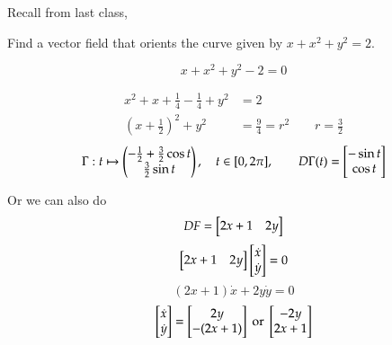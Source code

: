 Recall from last class, 

 Find a vector field that orients the curve given by $x+x^2+y^2=2$. 

\[x+x^2+y^2-2=0\]

\begin{align*}
	x^2+x+\frac{1}{4} - \frac{1}{4} + y^2 &= 2 \\
	\left(x+\frac{1}{2}\right)^2 + y^2 &= \frac{9}{4} = r^2 \qquad r=\frac{3}{2}
\end{align*}
\[\Gamma: t\mapsto \begin{pmatrix} -\frac{1}{2}+\frac{3}{2}\cos t \\ \frac{3}{2}\sin t \end{pmatrix}, \quad t\in [0,2\pi], \qquad D\Gamma(t) = \begin{bmatrix} -\sin t \\ \cos t \end{bmatrix}\]

Or we can also do 
\[DF = \begin{bmatrix} 2x+1 & 2y \end{bmatrix}\]
\[\begin{bmatrix} 2x+1 & 2y \end{bmatrix}\begin{bmatrix} \dot{x} \\ \dot{y} \end{bmatrix}=0\]
\[(2x+1)\dot{x}+2y\dot{y}=0\]
\[\begin{bmatrix} \dot{x} \\ \dot{y} \end{bmatrix} = \begin{bmatrix} 2y \\ -(2x+1) \end{bmatrix} \text{ or }\begin{bmatrix} -2y \\ 2x+1 \end{bmatrix}\]